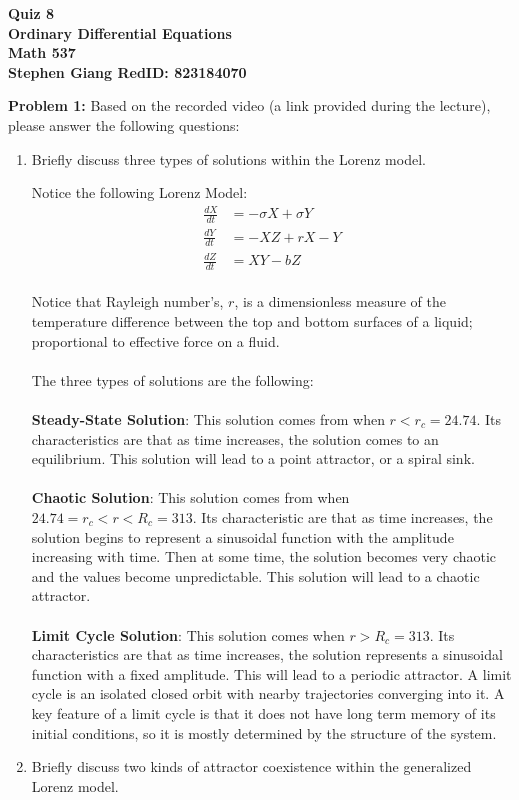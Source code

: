 \documentclass[11pt]{article}
\newcommand{\skipline}{\vspace{\baselineskip}}
\newenvironment{problem}[1]{\textbf{Problem #1: }}{\newpage}
\begin{document}
	
	\begin{center}
		\textbf{Quiz 8} \\
		\textbf{Ordinary Differential Equations} \\
		\textbf{Math 537} \\
		\textbf{Stephen Giang RedID: 823184070} \\
		\skipline \skipline
	\end{center}

	\begin{problem}{1}
		 Based on the recorded video (a link provided during the lecture), please answer the following questions:
		 \begin{enumerate}[label = (\alph*)]
		 	\item  Briefly discuss three types of solutions within the Lorenz model.

		 	\skipline
		 	Notice the following Lorenz Model:
		 	\begin{align*}
		 		\frac{dX}{dt} &= -\sigma X + \sigma Y \\
		 		\frac{dY}{dt} &= -XZ + rX - Y \\
		 		\frac{dZ}{dt} &= XY - bZ
		 	\end{align*}
	 		\\
		 	Notice that Rayleigh number's, $r$, is a dimensionless measure of the temperature difference between the top and bottom surfaces of a liquid; proportional to effective force on a fluid.
		 	\\ \\
		 	The three types of solutions are the following:
		 	\\ \\
		 	\textbf{Steady-State Solution}: This solution comes from when $r < r_c = 24.74$. Its characteristics are that as time increases, the solution comes to an equilibrium.  This solution will lead to a point attractor, or a spiral sink. 
		 	\\ \\
		 	\textbf{Chaotic Solution}: This solution comes from when $24.74 = r_c < r < R_c = 313$.  Its characteristic are that as time increases, the solution begins to represent a sinusoidal function with the amplitude increasing with time.  Then at some time, the solution becomes very chaotic and the values become unpredictable.  This solution will lead to a chaotic attractor.  
		 	\\ \\
		 	\textbf{Limit Cycle Solution}: This solution comes when $r > R_c = 313$.  Its characteristics are that as time increases, the solution represents a sinusoidal function with a fixed amplitude.  This will lead to a periodic attractor.  A limit cycle is an isolated closed orbit with nearby trajectories converging into it. A key feature of a limit cycle is that it does not have long term memory of its initial conditions, so it is mostly determined by the structure of the system. 
		 	\newpage
		 	\item Briefly discuss two kinds of attractor coexistence within the generalized Lorenz model.


\end{enumerate}
\end{problem}
\end{document}
